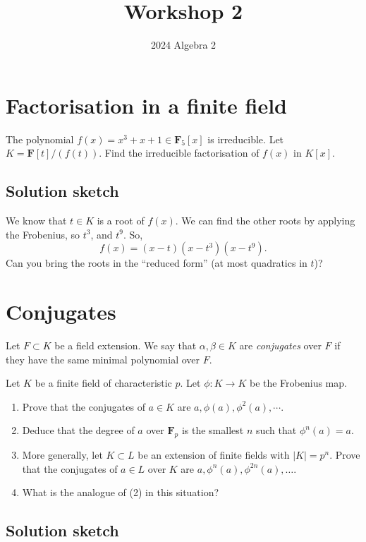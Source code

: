 \documentclass[12pt]{amsart}
\author{2024 Algebra 2}
\date{}
\title{Workshop 2}
\begin{document}
\maketitle
\section{Factorisation in a finite field}
\label{sec:orgfc8cc38}

The polynomial \(f(x) = x^3+x+1 \in \mathbf{F}_5[x]\) is irreducible.
Let \(K = \mathbf{F}[t]/(f(t))\).
Find the irreducible factorisation of \(f(x)\) in \(K[x]\).
\subsection{Solution sketch}
\label{sec:org2916367}

We know that \(t \in K\) is a root of \(f(x)\).
We can find the other roots by applying the Frobenius, so \(t^3\), and \(t^9\).
So,
\[ f(x) = (x-t)(x-t^3)(x-t^9).\]
Can you bring the roots in the ``reduced form'' (at most quadratics in \(t\))?
\section{Conjugates}
\label{sec:org60b222e}

Let \(F \subset K\) be a field extension.
We say that \(\alpha, \beta \in K\) are \emph{conjugates} over \(F\) if they have the same minimal polynomial over \(F\).

Let \(K\) be a finite field of characteristic \(p\).
Let \(\phi \colon K \to K\) be the Frobenius map.
\begin{enumerate}
\item Prove that the conjugates of \(a \in K\) are \(a, \phi(a), \phi^2(a), \cdots\).
\item Deduce that the degree of \(a\) over \(\mathbf{F}_p\) is the smallest \(n\) such that \(\phi^n(a) = a\).
\item More generally, let \(K \subset L\) be an extension of finite fields with \(|K| = p^n\).
Prove that the conjugates of \(a \in L\) over \(K\) are \(a, \phi^n(a), \phi^{2n}(a), \dots\).
\item What is the analogue of (2) in this situation?
\end{enumerate}
\subsection{Solution sketch}
\label{sec:org92ee38f}
\end{document}
